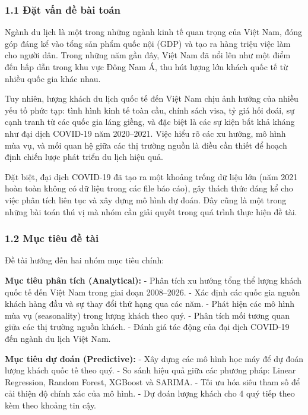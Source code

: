 \documentclass[11pt]{article}
\begin{document}
\subsubsection{1.1 Đặt vấn đề bài
toán}\label{ux111ux1eb7t-vux1ea5n-ux111ux1ec1-buxe0i-touxe1n}

Ngành du lịch là một trong những ngành kinh tế quan trọng của Việt Nam,
đóng góp đáng kể vào tổng sản phẩm quốc nội (GDP) và tạo ra hàng triệu
việc làm cho người dân. Trong những năm gần đây, Việt Nam đã nổi lên như
một điểm đến hấp dẫn trong khu vực Đông Nam Á, thu hút lượng lớn khách
quốc tế từ nhiều quốc gia khác nhau.

Tuy nhiên, lượng khách du lịch quốc tế đến Việt Nam chịu ảnh hưởng của
nhiều yếu tố phức tạp: tình hình kinh tế toàn cầu, chính sách visa, tỷ
giá hối đoái, sự cạnh tranh từ các quốc gia láng giềng, và đặc biệt là
các sự kiện bất khả kháng như đại dịch COVID-19 năm 2020--2021. Việc
hiểu rõ các xu hướng, mô hình mùa vụ, và mối quan hệ giữa các thị trường
nguồn là điều cần thiết để hoạch định chiến lược phát triển du lịch hiệu
quả.

Đặt biệt, đại dịch COVID-19 đã tạo ra một khoảng trống dữ liệu lớn (năm
2021 hoàn toàn không có dữ liệu trong các file báo cáo), gây thách thức
đáng kể cho việc phân tích liên tục và xây dựng mô hình dự đoán. Đây
cũng là một trong những bài toán thú vị mà nhóm cần giải quyết trong quá
trình thực hiện đề tài.

\subsubsection{1.2 Mục tiêu đề
tài}\label{mux1ee5c-tiuxeau-ux111ux1ec1-tuxe0i}

Đề tài hướng đến hai nhóm mục tiêu chính:

\textbf{Mục tiêu phân tích (Analytical):} - Phân tích xu hướng tổng thể
lượng khách quốc tế đến Việt Nam trong giai đoạn 2008--2026. - Xác định
các quốc gia nguồn khách hàng đầu và sự thay đổi thứ hạng qua các năm. -
Phát hiện các mô hình mùa vụ (seasonality) trong lượng khách theo quý. -
Phân tích mối tương quan giữa các thị trường nguồn khách. - Đánh giá tác
động của đại dịch COVID-19 đến ngành du lịch Việt Nam.

\textbf{Mục tiêu dự đoán (Predictive):} - Xây dựng các mô hình học máy
để dự đoán lượng khách quốc tế theo quý. - So sánh hiệu quả giữa các
phương pháp: Linear Regression, Random Forest, XGBoost và SARIMA. - Tối
ưu hóa siêu tham số để cải thiện độ chính xác của mô hình. - Dự đoán
lượng khách cho 4 quý tiếp theo kèm theo khoảng tin cậy.
\end{document}
